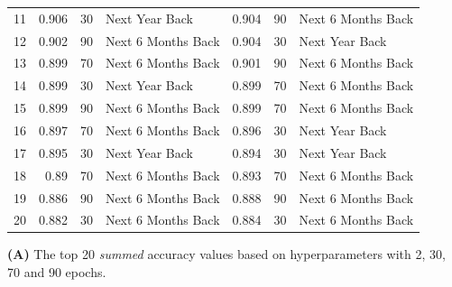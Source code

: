 \documentclass[utf8]{FrontiersinVancouver} %
\begin{document}
\begin{table}[htb]
\begin{center}
{\begin{tabular}{|l||r|r|l|r|r|l|}
11  &  0.906 &     30 &      Next Year Back &  0.904 &     90 &  Next 6 Months Back \\
12  &  0.902 &     90 &  Next 6 Months Back &  0.904 &     30 &      Next Year Back \\
13  &  0.899 &     70 &  Next 6 Months Back &  0.901 &     90 &  Next 6 Months Back \\
14  &  0.899 &     30 &      Next Year Back &  0.899 &     70 &  Next 6 Months Back \\
15  &  0.899 &     90 &  Next 6 Months Back &  0.899 &     70 &  Next 6 Months Back \\
16  &  0.897 &     70 &  Next 6 Months Back &  0.896 &     30 &      Next Year Back \\
17  &  0.895 &     30 &      Next Year Back &  0.894 &     30 &      Next Year Back \\
18  &  0.89 &     70 &  Next 6 Months Back &  0.893 &     70 &  Next 6 Months Back \\
19  &  0.886 &     90 &  Next 6 Months Back &  0.888 &     90 &  Next 6 Months Back \\
20  &  0.882 &     30 &  Next 6 Months Back &  0.884 &     30 &  Next 6 Months Back \\

        \hline
        \end{tabular}
        }
        \end{center}
        
        {\bf (A)} The top 20 {\em summed} accuracy values based on hyperparameters with 2, 30, 70 and 90 epochs.\


\end{table}
\end{document}
